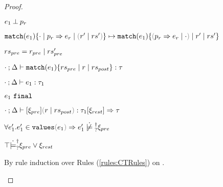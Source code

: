 \begin{proof}
\begin{byCases}
\begin{byCases}
\begin{byCases}
\begin{byCases}
      \item[\text{Scrutinee doesn't matche pattern}]
        \begin{pfsteps*}
        \item $e_1 \mathbin{\bot} p_r$  
        \item $\hlongtrans{\hmatch{e_1}{\zruls{\cdot}{\hrul{p_r}{e_r}}{\hrulesP{r'}{rs'}}}}{\hmatch{e_1}{\zruls{\hrulesP{\hrul{p_r}{e_r}}{\cdot}}{r'}{rs'}}}$ 
        \end{pfsteps*}
      \end{byCases}
    \end{byCases}
  \end{byCases}
    
\resetpfcounter
\item[\text{(\ref{rule:TMatchNZPre})}]
  \begin{pfsteps*}
  \item $rs_{pre} = r_{pre} \mid rs_{pre}'$ 
  \item $\cdot \mathbin{;} \Delta \vdash \mathtt{match}(e_1) \{rs_{pre} \mid r \mid rs_{post}\} : \tau$  
  \item $\cdot \mathbin{;} \Delta \vdash e_1 : \tau_1$  
  \item $e_1 ~\mathtt{final}$  
  \item $\chrulstyp{\cdot}{\Delta}{\xi_{pre}}{\hrulesP{r}{rs_{post}}}{\tau_1}{\xi_{rest}}{\tau}$  
  \item $\forall e_1'. \inValues{e_1'}{e_1} \Rightarrow \cnotsatisfyormay{e_1'}{\xi_{pre}}$  
  \item $\top \dot{\models}_{?}^{\dag} \xi_{pre} \vee \xi_{rest}$  
  \end{pfsteps*}
  By rule induction over Rules (\ref{rules:CTRules}) on .
  \begin{byCases}


\end{byCases}
\end{byCases}
\end{proof}
